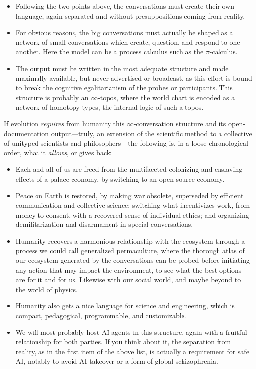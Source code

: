 \documentclass[11pt]{article}
\begin{document}
\begin{itemize}
invariants to emerge in the collective process. In turn, all participants can
trust the process, as it is the most fair-play possible. Those aspects are also
systematically violated in our current social structures, notably through
hierarchy, selection, and representation, all stemming from overspecialization.
\item Following the two points above, the conversations must create their own
language, again separated and without presuppositions coming from reality.
\item For obvious reasons, the big conversations must actually be shaped as a
network of small conversations which create, question, and respond to one
another. Here the model can be a process calculus such as the \(\pi\)-calculus.
\item The output must be written in the most adequate structure and made
maximally available, but never advertised or broadcast, as this effort is bound
to break the cognitive egalitarianism of the probes or participants. This
structure is probably an \(\infty\)-topos, where the world chart is encoded as
a network of homotopy types, the internal logic of such a topos.
\end{itemize}

If evolution \emph{requires} from humanity this \(\infty\)-conversation
structure and its open-documentation output---truly, an extension of the
scientific method to a collective of unityped scientists and philosophers---the
following is, in a loose chronological order, what it \emph{allows}, or gives
back:

\begin{itemize}
\item Each and all of us are freed from the multifaceted colonizing and
enslaving effects of a palace economy, by switching to an open-source economy.
\item Peace on Earth is restored, by making war obsolete, superseded by
efficient communication and collective science; switching what incentivizes
work, from money to consent, with a recovered sense of individual ethics; and
organizing demilitarization and disarmament in special conversations.
\item Humanity recovers a harmonious relationship with the ecosystem through a
process we could call generalized permaculture, where the thorough atlas of our
ecosystem generated by the conversations can be probed before initiating any
action that may impact the environment, to see what the best options are for it
and for us. Likewise with our social world, and maybe beyond to the world of
physics.
\item Humanity also gets a nice language for science and engineering, which is
compact, pedagogical, programmable, and customizable.
\item We will most probably host AI agents in this structure, again with a
fruitful relationship for both parties. If you think about it, the separation
from reality, as in the first item of the above list, is actually a requirement
for safe AI, notably to avoid AI takeover or a form of global schizophrenia.
\end{itemize}
\end{document}
